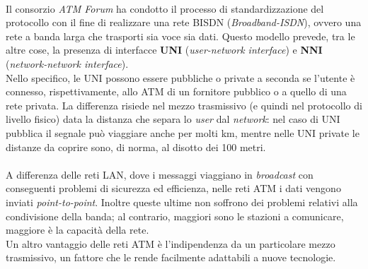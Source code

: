 \documentclass[a4paper,11pt]{article}
\def\vedi#1{\nameref{#1}}
\def\italic#1{\textit{#1}}
\begin{document}
\\Il consorzio \textit{ATM Forum} ha condotto il processo di standardizzazione del protocollo con il fine di realizzare una rete BISDN (\textit{Broadband-ISDN}), ovvero una rete a banda larga che trasporti sia voce sia dati. Questo modello prevede, tra le altre cose, la presenza di interfacce \textbf{UNI} (\textit{user-network interface}) e \textbf{NNI} (\textit{network-network interface}).
\\Nello specifico, le UNI possono essere pubbliche o private a seconda se l'utente è connesso, rispettivamente, allo \vedi{Switch} ATM di un fornitore pubblico o a quello di una rete privata. La differenza risiede nel mezzo trasmissivo (e quindi nel protocollo di livello fisico) data la distanza che separa lo \textit{user} dal \textit{network}: nel caso di UNI pubblica il segnale può viaggiare anche per molti km, mentre nelle UNI private le distanze da coprire sono, di norma, al disotto dei 100 metri.
\\\\A differenza delle reti LAN, dove i messaggi viaggiano in \italic{broadcast} con conseguenti problemi di sicurezza ed efficienza, nelle reti ATM i dati vengono inviati \italic{point-to-point}. Inoltre queste ultime non soffrono dei problemi relativi alla condivisione della banda; al contrario, maggiori sono le stazioni a comunicare, maggiore è la capacità della rete.
\\Un altro vantaggio delle reti ATM è l'indipendenza da un particolare mezzo trasmissivo, un fattore che le rende facilmente adattabili a nuove tecnologie.
\end{document}

